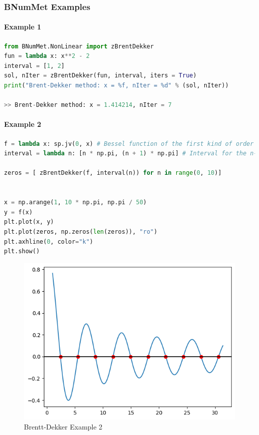 \subsubsection{BNumMet Examples}
\paragraph{Example 1}{
\begin{lstlisting}[language=Python]
from BNumMet.NonLinear import zBrentDekker
fun = lambda x: x**2 - 2
interval = [1, 2]
sol, nIter = zBrentDekker(fun, interval, iters = True)
print("Brent-Dekker method: x = %f, nIter = %d" % (sol, nIter))

>> Brent-Dekker method: x = 1.414214, nIter = 7
\end{lstlisting}
}
\paragraph{Example 2}{
\begin{lstlisting}[language=Python]
f = lambda x: sp.jv(0, x) # Bessel function of the first kind of order 0
interval = lambda n: [n * np.pi, (n + 1) * np.pi] # Interval for the n-th zero

zeros = [ zBrentDekker(f, interval(n)) for n in range(0, 10)]


x = np.arange(1, 10 * np.pi, np.pi / 50)
y = f(x)
plt.plot(x, y)
plt.plot(zeros, np.zeros(len(zeros)), "ro")
plt.axhline(0, color="k")
plt.show()
\end{lstlisting}
\begin{figure}[H]
    \centering
    \includegraphics{Include/Images/Thesis/Documentation/NonLinear/Brentt-Dekker Example 2.png}
    \caption{Brentt-Dekker Example 2}
    \label{fig:Brentt-Dekker Example 2}
\end{figure}
}